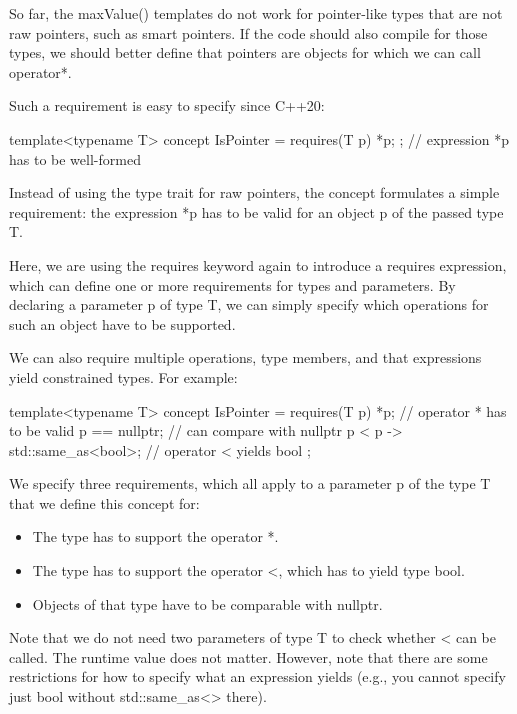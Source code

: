 
So far, the maxValue() templates do not work for pointer-like types that are not raw pointers, such as smart pointers. If the code should also compile for those types, we should better define that pointers are objects for which we can call operator*.

Such a requirement is easy to specify since C++20:

\begin{cpp}
template<typename T>
concept IsPointer = requires(T p) { *p; }; // expression *p has to be well-formed
\end{cpp}

Instead of using the type trait for raw pointers, the concept formulates a simple requirement: the expression *p has to be valid for an object p of the passed type T.

Here, we are using the requires keyword again to introduce a requires expression, which can define one or more requirements for types and parameters. By declaring a parameter p of type T, we can simply specify which operations for such an object have to be supported.

We can also require multiple operations, type members, and that expressions yield constrained types. For example:

\begin{cpp}
template<typename T>
concept IsPointer = requires(T p) {
	*p; // operator * has to be valid
	p == nullptr; // can compare with nullptr
	{p < p} -> std::same_as<bool>; // operator < yields bool
};
\end{cpp}

We specify three requirements, which all apply to a parameter p of the type T that we define this concept for:

\begin{itemize}
\item
The type has to support the operator *.

\item
The type has to support the operator <, which has to yield type bool.

\item
Objects of that type have to be comparable with nullptr.
\end{itemize}

Note that we do not need two parameters of type T to check whether < can be called. The runtime value does not matter. However, note that there are some restrictions for how to specify what an expression yields (e.g., you cannot specify just bool without std::same\_as<> there).

